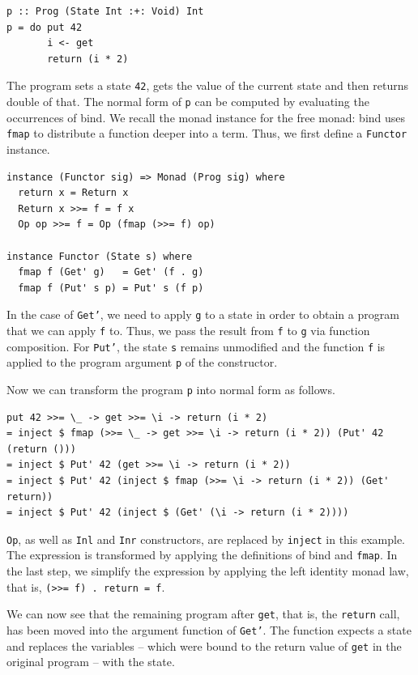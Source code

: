 \documentclass[a4paper, 11pt, fleqn, twoside, abstract=on]{scrreprt}
\newcommand{\hinl}[1]{\texttt{#1}}
\begin{document}
\begin{verbatim}
p :: Prog (State Int :+: Void) Int
p = do put 42
       i <- get
       return (i * 2)
\end{verbatim}

The program sets a state \hinl{42}, gets the value of the current state and then returns double of that.
The normal form of \hinl{p} can be computed by evaluating the occurrences of bind.
We recall the monad instance for the free monad: bind uses \hinl{fmap} to distribute a function deeper into a term.
Thus, we first define a \hinl{Functor} instance.

\begin{verbatim}
instance (Functor sig) => Monad (Prog sig) where
  return x = Return x
  Return x >>= f = f x
  Op op >>= f = Op (fmap (>>= f) op)

instance Functor (State s) where
  fmap f (Get' g)   = Get' (f . g)
  fmap f (Put' s p) = Put' s (f p)
\end{verbatim}

In the case of \hinl{Get'}, we need to apply \hinl{g} to a state in order to obtain a program that we can apply \hinl{f} to.
Thus, we pass the result from \hinl{f} to \hinl{g} via function composition.
For \hinl{Put'}, the state \hinl{s} remains unmodified and the function \hinl{f} is applied to the program argument \hinl{p} of the constructor.

Now we can transform the program \hinl{p} into normal form as follows.

\begin{verbatim}
put 42 >>= \_ -> get >>= \i -> return (i * 2)
= inject $ fmap (>>= \_ -> get >>= \i -> return (i * 2)) (Put' 42 (return ()))
= inject $ Put' 42 (get >>= \i -> return (i * 2))
= inject $ Put' 42 (inject $ fmap (>>= \i -> return (i * 2)) (Get' return))
= inject $ Put' 42 (inject $ (Get' (\i -> return (i * 2))))
\end{verbatim}

\hinl{Op}, as well as \hinl{Inl} and \hinl{Inr} constructors, are replaced by \hinl{inject} in this example.
The expression is transformed by applying the definitions of bind and \hinl{fmap}.
In the last step, we simplify the expression by applying the left identity monad law, that is, \hinl{(>>= f) . return = f}.

We can now see that the remaining program after \hinl{get}, that is, the \hinl{return} call, has been moved into the argument function of \hinl{Get'}.
The function expects a state and replaces the variables -- which were bound to the return value of \hinl{get} in the original program -- with the state.
\end{document}
